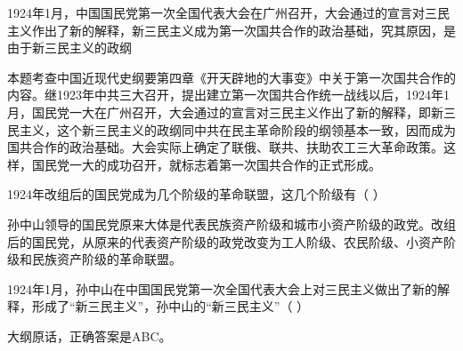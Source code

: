 \question 1924年1月，中国国民党第一次全国代表大会在广州召开，大会通过的宣言对三民主义作出了新的解释，新三民主义成为第一次国共合作的政治基础，究其原因，是由于新三民主义的政纲
\par{}
\begin{solution}本题考查中国近现代史纲要第四章《开天辟地的大事变》中关于第一次国共合作的内容。继1923年中共三大召开，提出建立第一次国共合作统一战线以后，1924年1月，国民党一大在广州召开，大会通过的宣言对三民主义作出了新的解释，即新三民主义，这个新三民主义的政纲同中共在民主革命阶段的纲领基本一致，因而成为国共合作的政治基础。大会实际上确定了联俄、联共、扶助农工三大革命政策。这样，国民党一大的成功召开，就标志着第一次国共合作的正式形成。
\end{solution}
\question 1924年改组后的国民党成为几个阶级的革命联盟，这几个阶级有（ ）
\par\twoch{\textcolor{red}{工人阶级}}{\textcolor{red}{农民阶级}}{\textcolor{red}{小资产阶级}}{\textcolor{red}{民族资产阶级}}
\begin{solution}孙中山领导的国民党原来大体是代表民族资产阶级和城市小资产阶级的政党。改组后的国民党，从原来的代表资产阶级的政党改变为工人阶级、农民阶级、小资产阶级和民族资产阶级的革命联盟。
\end{solution}
\question 1924年1月，孙中山在中国国民党第一次全国代表大会上对三民主义做出了新的解释，形成了``新三民主义''，孙中山的``新三民主义''（
）
\par{}
\begin{solution}大纲原话，正确答案是ABC。
\end{solution}
